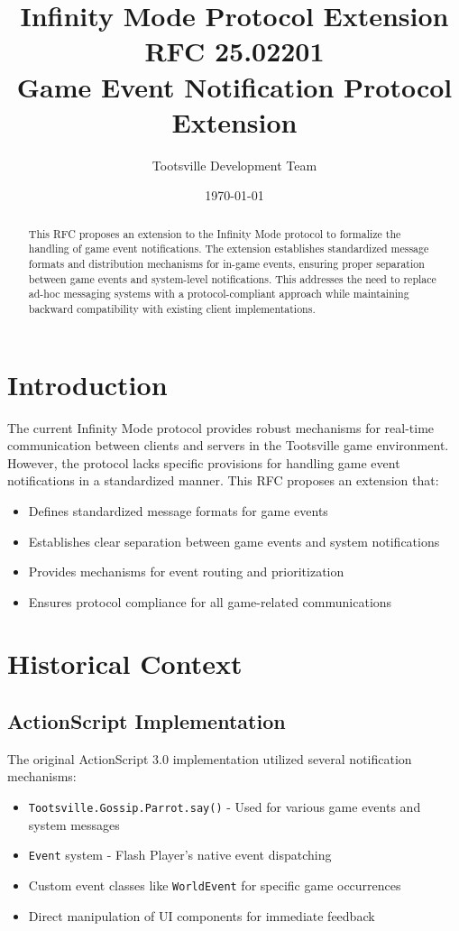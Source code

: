 \documentclass[12pt,a4paper]{article}
\title{Infinity Mode Protocol Extension\\RFC 25.02201\\Game Event Notification Protocol Extension}
\author{Tootsville Development Team}
\date{\today}
\begin{document}
\maketitle

\begin{abstract}
This RFC proposes an extension to the Infinity Mode protocol to formalize the handling of game event notifications. The extension establishes standardized message formats and distribution mechanisms for in-game events, ensuring proper separation between game events and system-level notifications. This addresses the need to replace ad-hoc messaging systems with a protocol-compliant approach while maintaining backward compatibility with existing client implementations.
\end{abstract}

\section{Introduction}

The current Infinity Mode protocol provides robust mechanisms for real-time communication between clients and servers in the Tootsville game environment. However, the protocol lacks specific provisions for handling game event notifications in a standardized manner. This RFC proposes an extension that:

\begin{itemize}
\item Defines standardized message formats for game events
\item Establishes clear separation between game events and system notifications
\item Provides mechanisms for event routing and prioritization
\item Ensures protocol compliance for all game-related communications
\end{itemize}

\section{Historical Context}

\subsection{ActionScript Implementation}

The original ActionScript 3.0 implementation utilized several notification mechanisms:

\begin{itemize}
\item \texttt{Tootsville.Gossip.Parrot.say()} - Used for various game events and system messages
\item \texttt{Event} system - Flash Player's native event dispatching
\item Custom event classes like \texttt{WorldEvent} for specific game occurrences
\item Direct manipulation of UI components for immediate feedback
\end{itemize}
\end{document}
